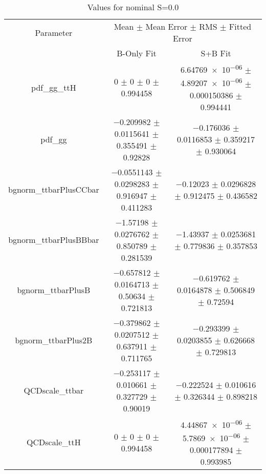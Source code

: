 \begin{table}
\centering
\caption{Values for nominal S=0.0}
\begin{tabular}{ccc}
\toprule
Parameter & \multicolumn{2}{c}{Mean $\pm$ Mean Error $\pm$ RMS $\pm$ Fitted Error}\\
 & B-Only Fit & S+B Fit\\
\midrule
pdf\_gg\_ttH & \num{0} $\pm$ \num{0} $\pm$ \num{0} $\pm$ \num{0.994458} & \num{6.64769e-06} $\pm$ \num{4.89207e-06} $\pm$ \num{0.000150386} $\pm$ \num{0.994441}\\
pdf\_gg & \num{-0.209982} $\pm$ \num{0.0115641} $\pm$ \num{0.355491} $\pm$ \num{0.92828} & \num{-0.176036} $\pm$ \num{0.0116853} $\pm$ \num{0.359217} $\pm$ \num{0.930064}\\
bgnorm\_ttbarPlusCCbar & \num{-0.0551143} $\pm$ \num{0.0298283} $\pm$ \num{0.916947} $\pm$ \num{0.411283} & \num{-0.12023} $\pm$ \num{0.0296828} $\pm$ \num{0.912475} $\pm$ \num{0.436582}\\
bgnorm\_ttbarPlusBBbar & \num{-1.57198} $\pm$ \num{0.0276762} $\pm$ \num{0.850789} $\pm$ \num{0.281539} & \num{-1.43937} $\pm$ \num{0.0253681} $\pm$ \num{0.779836} $\pm$ \num{0.357853}\\
bgnorm\_ttbarPlusB & \num{-0.657812} $\pm$ \num{0.0164713} $\pm$ \num{0.50634} $\pm$ \num{0.721813} & \num{-0.619762} $\pm$ \num{0.0164878} $\pm$ \num{0.506849} $\pm$ \num{0.72594}\\
bgnorm\_ttbarPlus2B & \num{-0.379862} $\pm$ \num{0.0207512} $\pm$ \num{0.637911} $\pm$ \num{0.711765} & \num{-0.293399} $\pm$ \num{0.0203855} $\pm$ \num{0.626668} $\pm$ \num{0.729813}\\
QCDscale\_ttbar & \num{-0.253117} $\pm$ \num{0.010661} $\pm$ \num{0.327729} $\pm$ \num{0.90019} & \num{-0.222524} $\pm$ \num{0.010616} $\pm$ \num{0.326344} $\pm$ \num{0.898218}\\
QCDscale\_ttH & \num{0} $\pm$ \num{0} $\pm$ \num{0} $\pm$ \num{0.994458} & \num{4.44867e-06} $\pm$ \num{5.7869e-06} $\pm$ \num{0.000177894} $\pm$ \num{0.993985}\\
\bottomrule
\end{tabular}
\end{table}